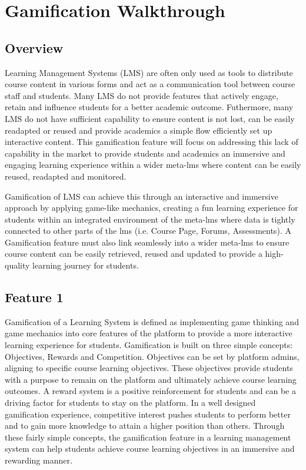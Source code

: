 \section{Gamification Walkthrough}
\subsection{Overview}
Learning Management Systems (LMS) are often only used as tools to distribute course content in various forms and act as a communication tool between course staff and students. Many LMS do not provide features that actively engage, retain and influence students for a better academic outcome. Futhermore, many LMS do not have sufficient capability to ensure content is not lost, can be easily readapted or reused and provide academics a simple flow efficiently set up interactive content. This gamification feature will focus on addressing this lack of capability in the market to provide students and academics an immersive and engaging learning experience within a wider meta-lms where content can be easily reused, readapted and monitored.
\newline

Gamification of LMS can achieve this through an interactive and immersive approach by applying game-like mechanics, creating a fun learning experience for students within an integrated environment of the meta-lms where data is tightly connected to other parts of the lms (i.e. Course Page, Forums, Assessments).
A Gamification feature must also link seamlessly into a wider meta-lms to ensure course content can be easily retrieved, reused and updated to provide a high-quality learning journey for students.

\subsection{Feature 1}
Gamification of a Learning System is defined as implementing game thinking and game mechanics into core features of the platform to provide a more interactive learning experience for students. Gamification is built on three simple concepts: Objectives, Rewards and Competition. Objectives can be set by platform admins, aligning to specific course learning objectives. 
These objectives provide students with a purpose to remain on the platform and ultimately achieve course learning outcomes. A reward system is a positive reinforcement for students and can be a driving factor for students to stay on the platform. In a well designed gamification experience, competitive interest pushes students to perform better and to gain more knowledge to attain a higher position than others. 
Through these fairly simple concepts, the gamification feature in a learning management system can help students achieve course learning objectives in an immersive and rewarding manner.

